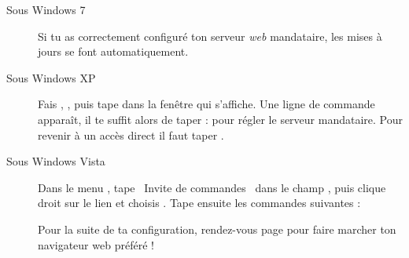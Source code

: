\begin{description}

\item[Sous Windows 7] Si tu as correctement configuré ton serveur \emph{web} mandataire, les mises à jours se font automatiquement.

\item[Sous Windows XP] Fais , , puis
tape  dans la fen\^etre qui s'affiche. Une ligne de commande apparaît,
il te suffit alors de taper :  pour r\'egler
le serveur mandataire. Pour revenir \`a  un acc\`es direct il faut taper .

\item[Sous Windows Vista]
Dans le menu , tape \guillemotleft~Invite de commandes~\guillemotright{} dans le champ , puis clique droit sur le lien
et choisis . Tape ensuite les commandes suivantes :

Pour la suite de ta configuration, rendez-vous page \pageref{browser} pour faire marcher ton navigateur web préféré !

\end{description}

\clearpage
